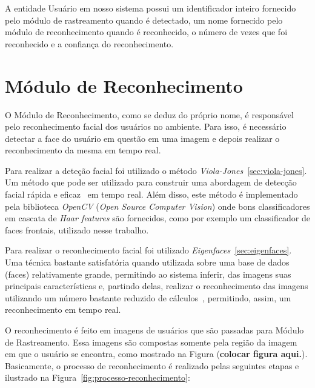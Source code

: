 A entidade Usuário em nosso sistema possui um identificador inteiro fornecido pelo módulo de rastreamento quando é detectado, um nome fornecido pelo módulo de reconhecimento quando é reconhecido, o número de vezes que foi reconhecido e a confiança do reconhecimento.

\section{Módulo de Reconhecimento}

	O Módulo de Reconhecimento, como se deduz do próprio nome, é responsável pelo reconhecimento facial dos usuários no ambiente. Para isso, é necessário detectar a face do usuário em questão em uma imagem e depois realizar o reconhecimento da mesma em tempo real. 

	Para realizar a deteção facial foi utilizado o método \textit{Viola-Jones}~\ref{sec:viola-jones}. Um método que pode ser utilizado para construir uma abordagem de detecção facial rápida e eficaz~\cite{violajones} em tempo real. Além disso, este método é implementado pela biblioteca \textit{OpenCV} (\textit{Open Source Computer Vision}) onde bons classificadores em cascata de \textit{Haar features} são fornecidos, como por exemplo um classificador de faces frontais, utilizado nesse trabalho.

	Para realizar o reconhecimento facial foi utilizado \textit{Eigenfaces}~\ref{sec:eigenfaces}. Uma técnica bastante satisfatória quando utilizada sobre uma base de dados (faces) relativamente grande, permitindo ao sistema inferir, das imagens suas principais características e, partindo delas, realizar o reconhecimento das imagens utilizando um número bastante reduzido de cálculos~\cite{artigo-eigenface}, permitindo, assim, um reconhecimento em tempo real.

	O reconhecimento é feito em imagens de usuários que são passadas para Módulo de Rastreamento. Essa imagens são compostas somente pela região da imagem em que o usuário se encontra, como mostrado na Figura (\textbf{colocar figura aqui.}). Basicamente, o processo de reconhecimento é realizado pelas seguintes etapas e ilustrado na Figura~\ref{fig:processo-reconhecimento}:

